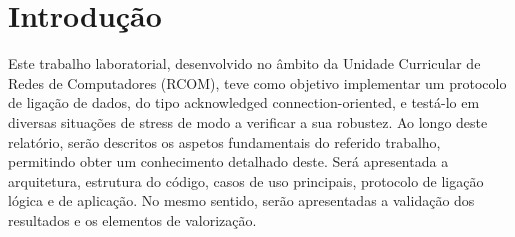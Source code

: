 \documentclass[a4paper]{article}
\begin{document}
\newpage

\section{Introdução}
Este trabalho laboratorial, desenvolvido no âmbito da Unidade Curricular de
Redes de Computadores (RCOM), teve como objetivo implementar um protocolo de
ligação de dados, do tipo acknowledged connection-oriented, e testá-lo em
diversas situações de stress de modo a verificar a sua robustez. Ao longo deste
relatório, serão descritos os aspetos fundamentais do referido trabalho,
permitindo obter um conhecimento detalhado deste. Será apresentada a
arquitetura, estrutura do código, casos de uso principais, protocolo de ligação
lógica e de aplicação. No mesmo sentido, serão apresentadas a validação dos
resultados e os elementos de valorização.
\end{document}
